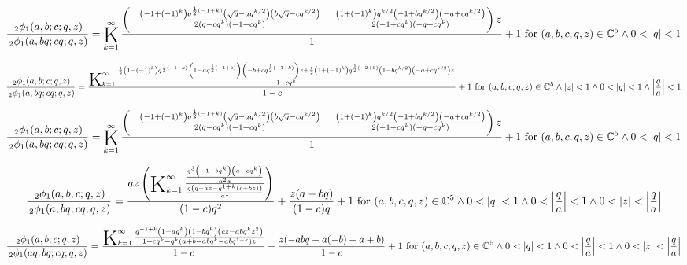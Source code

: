 \documentclass{article}
\newcommand{\bigK}{\mathop{\raisebox{-5pt}{\huge K}}}
\begin{document}
\[\frac{\, _2\phi _1(a,b;c;q,z)}{\, _2\phi _1(a,b q;c q;q,z)}=\bigK_{k=1}^{\infty}\frac{\left(-\frac{\left(-1+(-1)^k\right) q^{\frac{1}{2} (-1+k)} \left(\sqrt{q}-a q^{k/2}\right) \left(b \sqrt{q}-c q^{k/2}\right)}{2 \left(q-c q^k\right) \left(-1+c q^k\right)}-\frac{\left(1+(-1)^k\right) q^{k/2} \left(-1+b q^{k/2}\right) \left(-a+c q^{k/2}\right)}{2 \left(-1+c q^k\right) \left(-q+c q^k\right)}\right) z}{1}+1\text{ for }(a,b,c,q,z)\in \mathbb{C}^5\land 0<\left| q\right| <1\] 

\[\frac{\, _2\phi _1(a,b;c;q,z)}{\, _2\phi _1(a,b q;c q;q,z)}=\frac{\bigK_{k=1}^{\infty}\frac{\frac{1}{2} \left(1-(-1)^k\right) q^{\frac{1}{2} (-1+k)} \left(1-a q^{\frac{1}{2} (-1+k)}\right) \left(-b+c q^{\frac{1}{2} (-1+k)}\right) z+\frac{1}{2} \left(1+(-1)^k\right) q^{\frac{1}{2} (-2+k)} \left(1-b q^{k/2}\right) \left(-a+c q^{k/2}\right) z}{1-c q^k}}{1-c}+1\text{ for }(a,b,c,q,z)\in \mathbb{C}^5\land \left| z\right| <1\land 0<\left| q\right| <1\land \left| \frac{q}{a}\right| <1\] 

\[\frac{\, _2\phi _1(a,b;c;q,z)}{\, _2\phi _1(a,b q;c q;q,z)}=\bigK_{k=1}^{\infty}\frac{\left(-\frac{\left(-1+(-1)^k\right) q^{\frac{1}{2} (-1+k)} \left(\sqrt{q}-a q^{k/2}\right) \left(b \sqrt{q}-c q^{k/2}\right)}{2 \left(q-c q^k\right) \left(-1+c q^k\right)}-\frac{\left(1+(-1)^k\right) q^{k/2} \left(-1+b q^{k/2}\right) \left(-a+c q^{k/2}\right)}{2 \left(-1+c q^k\right) \left(-q+c q^k\right)}\right) z}{1}+1\text{ for }(a,b,c,q,z)\in \mathbb{C}^5\land 0<\left| q\right| <1\] 

\[\frac{\, _2\phi _1(a,b;c;q,z)}{\, _2\phi _1(a,b q;c q;q,z)}=\frac{a z \left(\bigK_{k=1}^{\infty}\frac{\frac{q^3 \left(-1+b q^k\right) \left(a-c q^k\right)}{a^2 z}}{\frac{q \left(q+a z-q^{1+k} (c+b z)\right)}{a z}}\right)}{(1-c) q^2}+\frac{z (a-b q)}{(1-c) q}+1\text{ for }(a,b,c,q,z)\in \mathbb{C}^5\land 0<\left| q\right| <1\land 0<\left| \frac{q}{a}\right| <1\land 0<\left| z\right| <\left| \frac{q}{a}\right|\] 

\[\frac{\, _2\phi _1(a,b;c;q,z)}{\, _2\phi _1(a q,b q;c q;q,z)}=\frac{\bigK_{k=1}^{\infty}\frac{q^{-1+k} \left(1-a q^k\right) \left(1-b q^k\right) \left(c z-a b q^k z^2\right)}{1-c q^k-q^k \left(a+b-a b q^k-a b q^{1+k}\right) z}}{1-c}-\frac{z (-a b q+a (-b)+a+b)}{1-c}+1\text{ for }(a,b,c,q,z)\in \mathbb{C}^5\land 0<\left| q\right| <1\land 0<\left| \frac{q}{a}\right| <1\land 0<\left| z\right| <\left| \frac{q}{a}\right|\] 
\end{document}
